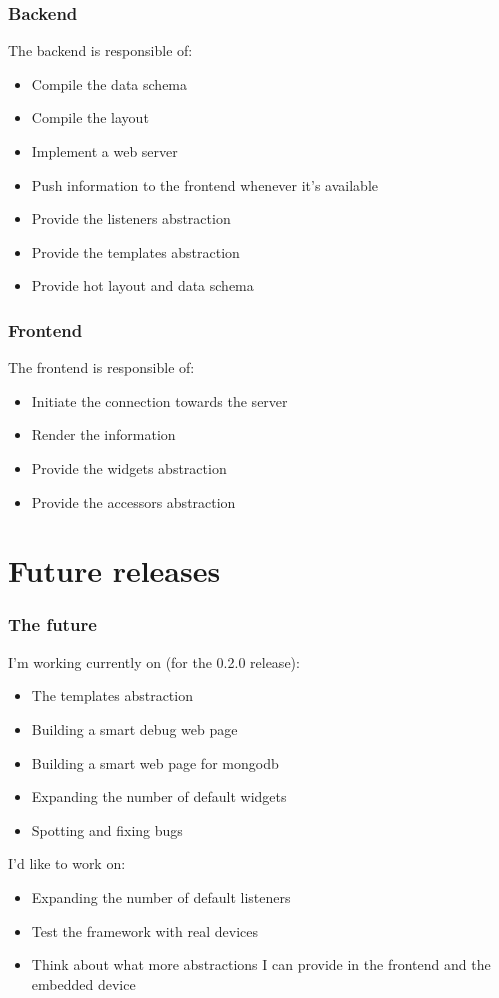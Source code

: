 \documentclass{beamer}
\begin{document}
    \begin{frame}
        \frametitle{Backend}
        The backend is responsible of:

        \begin{itemize}
            \item Compile the data schema
            \item Compile the layout
            \item Implement a web server
            \item Push information to the frontend whenever it's available
            \item Provide the listeners abstraction
            \item Provide the templates abstraction
            \item Provide hot layout and data schema
        \end{itemize}
    \end{frame}

    \begin{frame}
        \frametitle{Frontend}
        The frontend is responsible of:

        \begin{itemize}
            \item Initiate the connection towards the server
            \item Render the information
            \item Provide the widgets abstraction
            \item Provide the accessors abstraction
        \end{itemize}
    \end{frame}

    \section{Future releases}
    \begin{frame}
        \frametitle{The future}
        I'm working currently on (for the 0.2.0 release):
        \begin{itemize}
            \item The templates abstraction
            \item Building a smart debug web page
            \item Building a smart web page for mongodb
            \item Expanding the number of default widgets
            \item Spotting and fixing bugs
        \end{itemize}

        I'd like to work on:
        \begin{itemize}
            \item Expanding the number of default listeners
            \item Test the framework with real devices
            \item Think about what more abstractions I can provide in the
                frontend and the embedded device
        \end{itemize}
    \end{frame}
\end{document}
